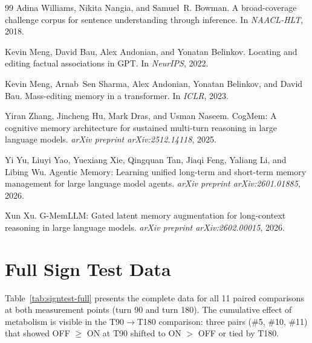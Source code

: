 \documentclass[11pt,a4paper]{article}
\begin{document}
\begin{thebibliography}{99}
Adina Williams, Nikita Nangia, and Samuel~R. Bowman.
\newblock A broad-coverage challenge corpus for sentence understanding through inference.
\newblock In \emph{NAACL-HLT}, 2018.

Kevin Meng, David Bau, Alex Andonian, and Yonatan Belinkov.
\newblock Locating and editing factual associations in GPT.
\newblock In \emph{NeurIPS}, 2022.

Kevin Meng, Arnab~Sen Sharma, Alex Andonian, Yonatan Belinkov, and David Bau.
\newblock Mass-editing memory in a transformer.
\newblock In \emph{ICLR}, 2023.

Yiran Zhang, Jincheng Hu, Mark Dras, and Usman Naseem.
\newblock CogMem: A cognitive memory architecture for sustained multi-turn reasoning in large language models.
\newblock \emph{arXiv preprint arXiv:2512.14118}, 2025.

Yi Yu, Liuyi Yao, Yuexiang Xie, Qingquan Tan, Jiaqi Feng, Yaliang Li, and Libing Wu.
\newblock Agentic Memory: Learning unified long-term and short-term memory management for large language model agents.
\newblock \emph{arXiv preprint arXiv:2601.01885}, 2026.

Xun Xu.
\newblock G-MemLLM: Gated latent memory augmentation for long-context reasoning in large language models.
\newblock \emph{arXiv preprint arXiv:2602.00015}, 2026.

\end{thebibliography}

\appendix

\section{Full Sign Test Data}
\label{app:signtest}

Table~\ref{tab:signtest-full} presents the complete data for all 11 paired comparisons at both measurement points (turn 90 and turn 180). The cumulative effect of metabolism is visible in the T90$\to$T180 comparison: three pairs (\#5, \#10, \#11) that showed OFF $\geq$ ON at T90 shifted to ON $>$ OFF or tied by T180.
\end{document}
